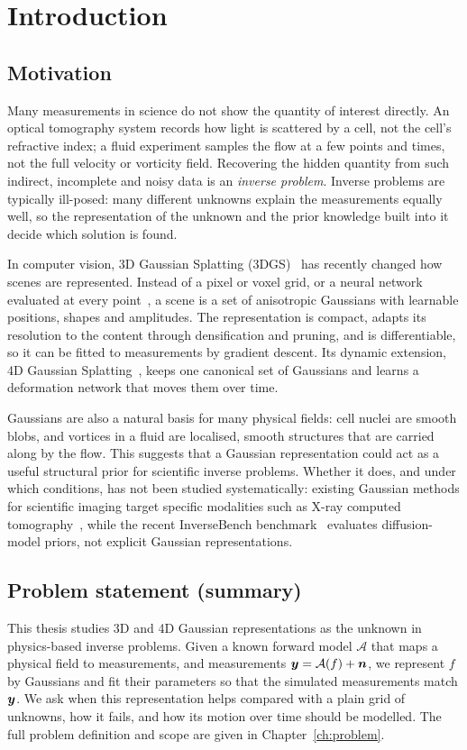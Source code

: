 \chapter{Introduction}
\label{ch:intro}

\section{Motivation}
Many measurements in science do not show the quantity of interest directly. An optical tomography system records how
light is scattered by a cell, not the cell's refractive index; a fluid experiment samples the flow at a few points and
times, not the full velocity or vorticity field. Recovering the hidden quantity from such indirect, incomplete and
noisy data is an \emph{inverse problem}. Inverse problems are typically ill-posed: many different unknowns explain
the measurements equally well, so the representation of the unknown and the prior knowledge built into it decide
which solution is found.

In computer vision, 3D Gaussian Splatting (3DGS)~\citep{kerbl20233dgs} has recently changed how scenes are
represented. Instead of a pixel or voxel grid, or a neural network evaluated at every point~\citep{mildenhall2020nerf},
a scene is a set of anisotropic Gaussians with learnable positions, shapes and amplitudes. The representation is
compact, adapts its resolution to the content through densification and pruning, and is differentiable, so it can be
fitted to measurements by gradient descent. Its dynamic extension, 4D Gaussian Splatting~\citep{wu20244dgs}, keeps
one canonical set of Gaussians and learns a deformation network that moves them over time.

Gaussians are also a natural basis for many physical fields: cell nuclei are smooth blobs, and vortices in a fluid are
localised, smooth structures that are carried along by the flow. This suggests that a Gaussian representation could
act as a useful structural prior for scientific inverse problems. Whether it does, and under which conditions, has not
been studied systematically: existing Gaussian methods for scientific imaging target specific modalities such as
X-ray computed tomography~\citep{cai2024xgaussian,zha2024r2gaussian}, while the recent InverseBench
benchmark~\citep{zheng2025inversebench} evaluates diffusion-model priors, not explicit Gaussian representations.

\section{Problem statement (summary)}
This thesis studies 3D and 4D Gaussian representations as the unknown in physics-based inverse problems. Given a
known forward model $\mathcal{A}$ that maps a physical field to measurements, and measurements
$\bm{y}=\mathcal{A}(f)+\bm{n}$, we represent $f$ by Gaussians and fit their parameters so that the simulated
measurements match $\bm{y}$. We ask when this representation helps compared with a plain grid of unknowns, how it
fails, and how its motion over time should be modelled. The full problem definition and scope are given in
Chapter~\ref{ch:problem}.

